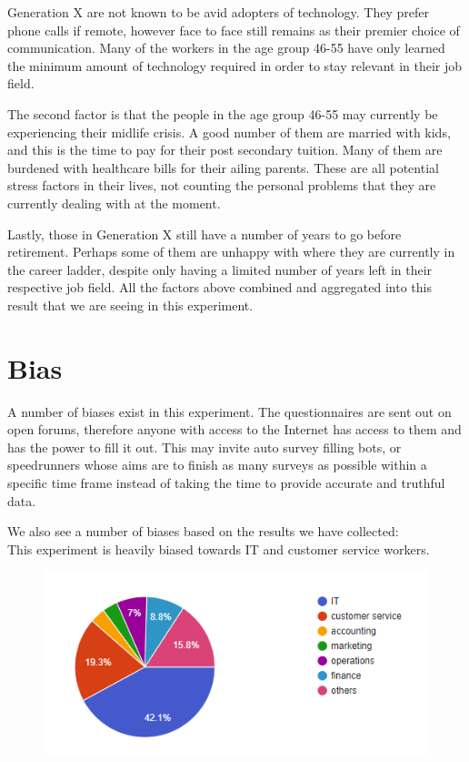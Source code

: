 \documentclass[12pt]{article}
\begin{document}
Generation X are not known to be avid adopters of technology. They prefer phone calls if remote, however face to face still remains as their premier choice of communication. Many of the workers in the age group 46-55 have only learned the minimum amount of technology required in order to stay relevant in their job field.

The second factor is that the people in the age group 46-55 may currently be experiencing their midlife crisis. A good number of them are married with kids, and this is the time to pay for their post secondary tuition. Many of them are burdened with healthcare bills for their ailing parents. These are all potential stress factors in their lives, not counting the personal problems that they are currently dealing with at the moment. 

Lastly, those in Generation X still have a number of years to go before retirement. Perhaps some of them are unhappy with where they are currently in the career ladder, despite only having a limited number of years left in their respective job field. 
All the factors above combined and aggregated into this result that we are seeing in this experiment. 

\section*{Bias}

A number of biases exist in this experiment. The questionnaires are sent out on open forums, therefore anyone with access to the Internet has access to them and has the power to fill it out. This may invite auto survey filling bots, or speedrunners whose aims are to finish as many surveys as possible within a specific time frame instead of taking the time to provide accurate and truthful data.

We also see a number of biases based on the results we have collected: \\
This experiment is heavily biased towards IT and customer service workers.
\begin{figure}[h]
    \centering
    \includegraphics[scale=1]{bias_it.png}
    \label{bias_it}
\end{figure} 
\end{document}
